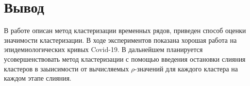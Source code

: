 \documentclass{article}
\begin{document}
\section{Вывод}
В работе описан метод кластеризации временных рядов, приведен способ оценки значимости кластеризации. В ходе экспериментов показана хорошая работа на эпидемиологических кривых Covid-19. В дальнейшем планируется усовершенствовать метод кластеризации с помощью введения остановки слияния кластеров в заыисимости от вычисляемых $\rho$-значений для каждого кластера на каждом этапе слияния. 






\end{document}
